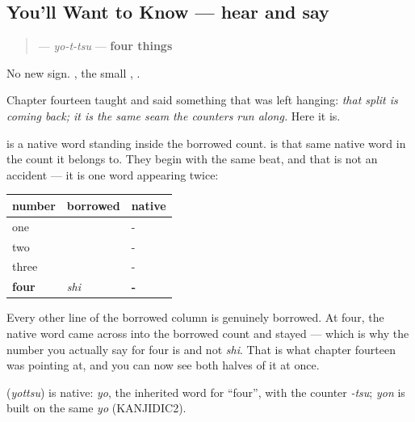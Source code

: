 \subsection*{You'll Want to Know — hear and say}
\begin{quote}
\textbf{} — \emph{yo-t-tsu} — \textbf{four things}
\end{quote}

No new sign. \textbf{}, the small \textbf{}, \textbf{}.

\begin{grammarlens}[title={Grammar Lens — the seam, from the other side}]
Chapter fourteen taught \textbf{} and said something that was left hanging: \emph{that split is coming back; it is the same seam the counters run along.} Here it is.

\textbf{} is a native word standing inside the borrowed count. \textbf{} is that same native word in the count it belongs to. They begin with the same beat, and that is not an accident — it is one word appearing twice:

\noindent
\begin{tabularx}{\linewidth}{@{}>{\raggedright\arraybackslash}X>{\raggedright\arraybackslash}X>{\raggedright\arraybackslash}X@{}}
\toprule
\textbf{number} & \textbf{borrowed} & \textbf{native} \\
\midrule
one & \ja{いち} & \ja{ひと}- \\
two & \ja{に} & \ja{ふた}- \\
three & \ja{さん} & \ja{み}- \\
\textbf{four} & \emph{shi} & \textbf{\ja{よ}-} \\
\bottomrule
\end{tabularx}

Every other line of the borrowed column is genuinely borrowed. At four, the native word came across into the borrowed count and stayed — which is why the number you actually say for four is \textbf{} and not \emph{shi}. That is what chapter fourteen was pointing at, and you can now see both halves of it at once.
\end{grammarlens}

\begin{cousinweb}
\textbf{} (\emph{yottsu}) is native: \emph{yo}, the inherited word for \textquotedblleft{}four\textquotedblright{}, with the counter \emph{-tsu}; \emph{yon} is built on the same \emph{yo} (KANJIDIC2).
\end{cousinweb}

